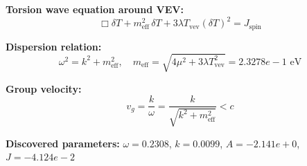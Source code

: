 
\textbf{Torsion wave equation around VEV:}
\begin{equation}
  \Box \delta T + m_{\text{eff}}^2 \, \delta T + 3\lambda T_{\text{vev}} (\delta T)^2 = J_{\text{spin}}
\end{equation}

\textbf{Dispersion relation:}
\begin{equation}
  \omega^2 = k^2 + m_{\text{eff}}^2, \quad
  m_{\text{eff}} = \sqrt{4\mu^2 + 3\lambda T_{\text{vev}}^2} = 2.3278e-1 \text{ eV}
\end{equation}

\textbf{Group velocity:}
\begin{equation}
  v_g = \frac{k}{\omega} = \frac{k}{\sqrt{k^2 + m_{\text{eff}}^2}} < c
\end{equation}

\textbf{Discovered parameters:}
$\omega = 0.2308$, \quad
$k = 0.0099$, \quad
$A = -2.141e+0$, \quad
$J = -4.124e-2$
